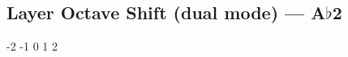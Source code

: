 \subsection{Layer Octave Shift (dual mode) --- A$\flat$2}







































-2
-1
0
1
2

